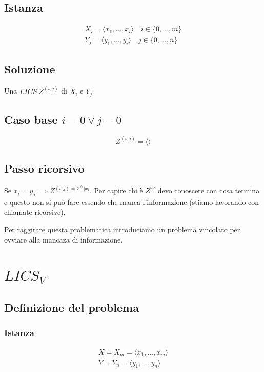 \subsection{Istanza}
{
    \large

    \begin{gather*}
        X_i = \langle x_1, \dots, x_i \rangle \quad i \in \{0, \dots, m\} \\
        Y_j = \langle y_1, \dots, y_i \rangle \quad j \in \{0, \dots, n\} 
    \end{gather*}
}

\subsection{Soluzione}
Una $LICS\ Z^{(i,j)}$ di $X_i$ e $Y_j$

\subsection{Caso base $i = 0 \lor j=0$}
{
    \large
    $$
        Z^{(i,j)} = \langle \rangle
    $$
}

\subsection{Passo ricorsivo}
Se $x_i = y_j \implies Z^{(i,j)= Z^{??} | x_i}$. Per capire chi è $Z^{??}$ devo conoscere con cosa termina e questo non si può fare essendo che manca l'informazione (stiamo lavorando con chiamate ricorsive).

Per raggirare questa problematica introduciamo un problema vincolato per ovviare alla mancaza di informazione.

\newpage
\section{$LICS_V$}

\subsection{Definizione del problema}

\subsubsection{Istanza}
{
    \large

    \begin{gather*}
        X = X_m = \langle x_1, \dots, x_m \rangle \\
        Y = Y_n = \langle y_1, \dots, y_n \rangle
    \end{gather*}
}

